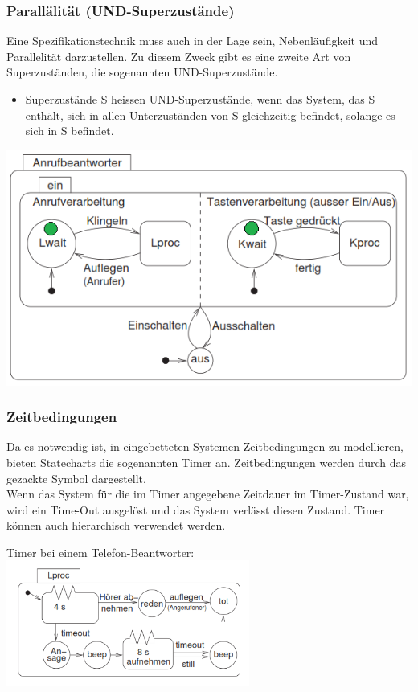 \subsubsection{Parallälität (UND-Superzustände)}
\begin{multicols}{2}
Eine Spezifikationstechnik muss auch in der Lage sein, Nebenläufigkeit und Parallelität darzustellen. Zu diesem Zweck gibt es eine zweite Art von Superzuständen, die sogenannten UND-Superzustände.
\begin{itemize}
\item Superzustände S heissen UND-Superzustände, wenn das System, das S enthält, sich in allen Unterzuständen von S gleichzeitig befindet,
solange es sich in S befindet.
\end{itemize}
\vfill\null
\columnbreak
\begin{center}
\includegraphics[width=0.8\linewidth]{images/FSM/AND_super_state}
\end{center}
\end{multicols}

\subsubsection{Zeitbedingungen}
\begin{multicols}{2}
Da es notwendig ist, in eingebetteten Systemen Zeitbedingungen zu modellieren, bieten Statecharts die sogenannten Timer an. Zeitbedingungen werden durch das gezackte Symbol dargestellt.\\
Wenn das System für die im Timer angegebene Zeitdauer im Timer-Zustand war, wird ein Time-Out ausgelöst und das System verlässt diesen Zustand. Timer können auch hierarchisch verwendet werden.\\
\vfill\null
\begin{center}
\columnbreak
Timer bei einem Telefon-Beantworter:\\
\includegraphics[width=8cm]{images/FSM/timer}
\end{center}
\end{multicols}
\newpage
